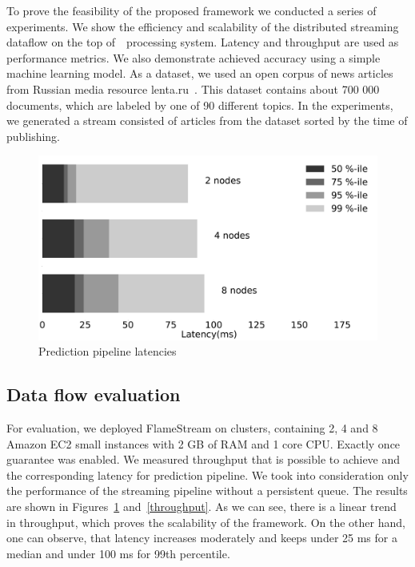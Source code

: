 \label {fs-experiments}

To prove the feasibility of the proposed framework we conducted a series of experiments. We show the efficiency and scalability of the distributed streaming dataflow on the top of~\FlameStream\ processing system. Latency and throughput are used as performance metrics. We also demonstrate achieved accuracy using a simple machine learning model. As a dataset, we used an open corpus of news articles from Russian media resource lenta.ru~\cite{lentaru}. This dataset contains about 700 000 documents, which are labeled by one of 90 different topics. In the experiments, we generated a stream consisted of articles from the dataset sorted by the time of publishing.

\begin{figure}[htbp]
  \centering
  \includegraphics[scale=0.1]{pics/classifier_latencies}
  \caption{Prediction pipeline latencies}
  \label {latencies}
\end{figure}

\subsection{Data flow evaluation}

For evaluation, we deployed FlameStream on clusters, containing 2, 4 and 8 Amazon EC2 small instances with 2 GB of RAM and 1 core CPU. Exactly once guarantee was enabled. We measured throughput that is possible to achieve and the corresponding latency for prediction pipeline. We took into consideration only the performance of the streaming pipeline without a persistent queue. The results are shown in Figures~\ref{latencies} and~\ref{throughput}. As we can see, there is a linear trend in throughput, which proves the scalability of the framework. On the other hand, one can observe, that latency increases moderately and keeps under 25 ms for a median and under 100 ms for 99th percentile.

